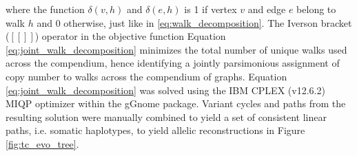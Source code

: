 \documentclass[phd,tocprelim]{cornell}
\renewcommand{\caption}[1]{\singlespacing\hangcaption{#1}\normalspacing}
\begin{document}
where the function $\delta(v,h)$ and $\delta(e,h)$ is 1 if vertex $v$ and edge $e$ belong to walk $h$ and 0 otherwise, just like in \ref{eq:walk_decomposition}. The Iverson bracket ($[\![]\!]$) operator in the objective function Equation \ref{eq:joint_walk_decomposition} minimizes the total number of unique walks used across the compendium, hence identifying a jointly parsimonious assignment of copy number to walks across the compendium of graphs. Equation \ref{eq:joint_walk_decomposition} was solved using the IBM CPLEX (v12.6.2) MIQP optimizer within the gGnome package. Variant cycles and paths from the resulting solution were manually combined to yield a set of consistent linear paths, i.e. somatic haplotypes, to yield allelic reconstructions in Figure \ref{fig:tc_evo_tree}.

\clearpage
\begin{figure}[ht]
\end{figure}
\clearpage
\end{document}
